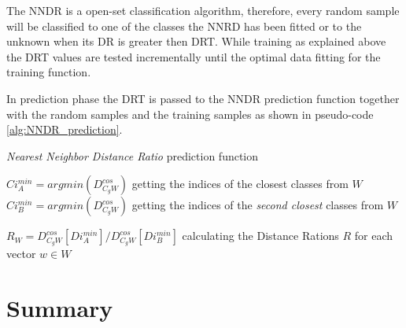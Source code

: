 The NNDR is a open-set classification algorithm, therefore, every random sample will be classified to one of the classes the NNRD has been fitted or to the unknown when its DR is greater then DRT. While training as explained above the DRT values are tested incrementally until the optimal data fitting for the training function.

In prediction phase the DRT is passed to the NNDR prediction function together with the random samples and the training samples as shown in pseudo-code \ref{alg:NNDR_prediction}.

\hfill

\begin{algorithm}[H][t]
\caption{\textit{Nearest Neighbor Distance Ratio} prediction function}\label{alg:NNDR_prediction}


$Ci^{min}_{A} = argmin(D^{cos}_{C_{g}W})$ getting the indices of the closest classes from $W$\;
$Ci^{min}_{B} = argmin(D^{cos}_{C_{g}W})$ getting the indices of the \textit{second closest} classes from $W$\;

$R_{W} = D^{cos}_{C_{g}W}[Di^{min}_{A}] / D^{cos}_{C_{g}W}[Di^{min}_{B}]$ calculating the Distance Rations $R$ for each vector $w \in W$


\end{algorithm}

\hfill

\section{Summary}\label{chap:openset:sec:NNRD_Description}

